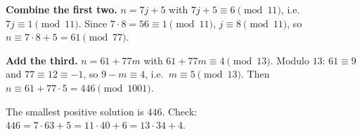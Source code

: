 \textbf{Combine the first two.} $n=7j+5$ with $7j+5\equiv6\pmod{11}$, i.e.\ $7j\equiv1\pmod{11}$. Since $7\cdot8=56\equiv1\pmod{11}$, $j\equiv8\pmod{11}$, so $n\equiv7\cdot8+5=61\pmod{77}$.

\textbf{Add the third.} $n=61+77m$ with $61+77m\equiv4\pmod{13}$. Modulo $13$: $61\equiv9$ and $77\equiv12\equiv-1$, so $9-m\equiv4$, i.e.\ $m\equiv5\pmod{13}$. Then $n\equiv61+77\cdot5=446\pmod{1001}$.

The smallest positive solution is $\boxed{446}$. Check: $446=7\cdot63+5=11\cdot40+6=13\cdot34+4$.
